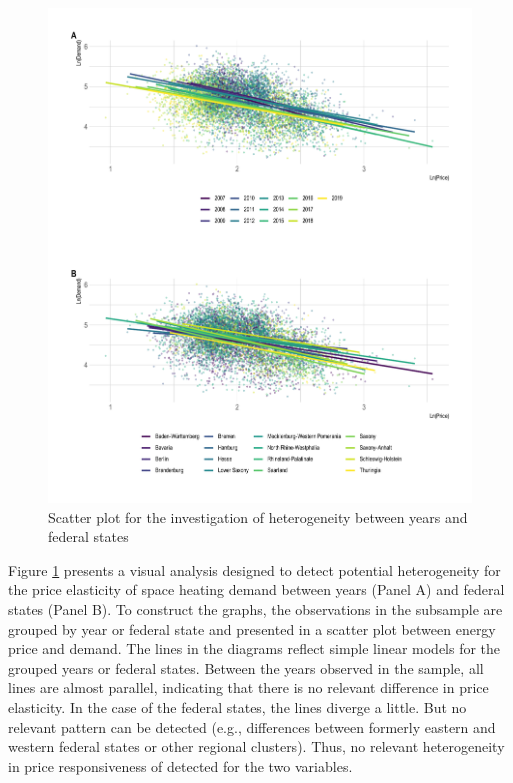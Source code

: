 \documentclass[12pt,twoside]{reedthesis}
\begin{document}
\newpage
\begin{figure}

{\centering \includegraphics[width=1\linewidth]{figure/year_state_heterogeneity_plot} 

}

\caption{Scatter plot for the investigation of heterogeneity between years and federal states}\label{fig:heterogeneity-year-state-plot}
\end{figure}
\noindent
Figure \ref{fig:heterogeneity-year-state-plot} presents a visual analysis designed to detect potential heterogeneity for the price elasticity of space heating demand between years (Panel A) and federal states (Panel B). To construct the graphs, the observations in the subsample are grouped by year or federal state and presented in a scatter plot between energy price and demand. The lines in the diagrams reflect simple linear models for the grouped years or federal states. Between the years observed in the sample, all lines are almost parallel, indicating that there is no relevant difference in price elasticity. In the case of the federal states, the lines diverge a little. But no relevant pattern can be detected (e.g., differences between formerly eastern and western federal states or other regional clusters). Thus, no relevant heterogeneity in price responsiveness of detected for the two variables.
\end{document}
